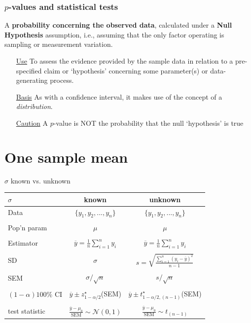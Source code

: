 \documentclass[handout]{beamer}\usepackage[]{graphicx}\usepackage[]{color}
\begin{document}
\begin{frame}
\frametitle{$p$-values and statistical tests}


\begin{defm}[$p$-value]
	A \textbf{probability concerning the observed data}, calculated under a \textbf{Null Hypothesis} assumption, i.e., assuming that the only factor operating is sampling or measurement variation. 
\end{defm}

\begin{itemize} 
	\item[\underline{Use}] To assess the evidence provided by the sample data
	in relation to a pre-specified claim or `hypothesis' concerning some parameter(s) or data-generating process. 
	\item[\underline{Basis}] As with a confidence interval, it makes use of the concept of a \textit{distribution}. 
	\item[\underline{Caution}] A $p$-value is NOT the probability that the null `hypothesis' is true
\end{itemize}
\end{frame}


\section{One sample mean}


\begin{frame}{$\sigma$ known vs. unknown}
\begin{center}
	\begin{tabular}{|l|c|c|} \hline
		$\sigma$& known & unknown \\ \hline Data & $\{y_1,y_2,...,y_n\}$ &
		$\{y_1,y_2,...,y_n\}$\\
		& & \\
		Pop'n param & $\mu$ & $\mu$\\
		& & \\
		Estimator & $\overline{y} = \frac{1}{n}\sum_{i=1}^n y_i$ & $\overline{y} = \frac{1}{n}\sum_{i=1}^n y_i$ \\
		& & \\
		SD & $\sigma$ & $s = \sqrt{\frac{\sum_{i=1}^n(y_i-\overline{y})^2}{n-1}}$ \\
		& & \\
		SEM & $\sigma/\sqrt{n}$ & $s / \sqrt{n}$ \\
		& & \\
		$(1-\alpha)100$\% CI & $\overline{y} \pm z^\star_{1-\alpha/2}$(SEM) & $\overline{y} \pm t^\star_{1-\alpha/2, (n-1)}$(SEM) \\
		& & \\
		test statistic & $\frac{\overline{y}-\mu_0}{\textrm{SEM}}\sim \mathcal{N}(0,1)$ &
		$\frac{\overline{y}-\mu_0}{\textrm{SEM}}\sim t_{(n-1)}$ \\
		\hline
	\end{tabular}
\end{center}
\end{frame}
\end{document}
